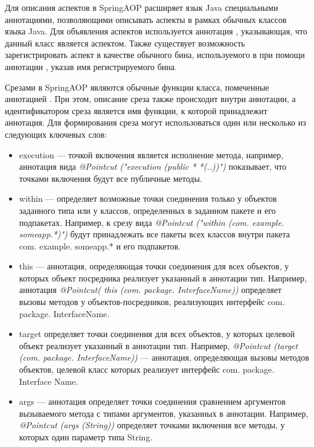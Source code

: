 Для описания аспектов в SpringAOP расширяет язык Java специальными аннотациями,
позволяющими описывать аспекты в рамках обычных классов языка Java.
Для объявления аспектов используется аннотация , указывающая,
что данный класс является аспектом.
Также существует возможность зарегистрировать аспект в качестве обычного бина,
используемого в  при помощи аннотации
, указав имя регистрируемого бина.

Срезами в SpringAOP являются обычные функции класса, помеченные аннотацией
.
При этом, описание среза также происходит внутри аннотации, а идентификатором
среза является имя функции, к которой принадлежит аннотация.
Для формирования среза могут использоваться один или несколько из следующих 
ключевых слов:
  \begin{itemize}
    \item execution --- точкой включения является исполнение метода, 
      например, аннотация вида \textit{@Pointcut ("execution (public * 
      *(..))")} показывает, что точками включения будут все публичные методы.
    \item within --- определяет возможные точки соединения только у объектов 
      заданного типа или у классов, определенных в заданном пакете и его 
      подпакетах.
      Например, к срезу вида \textit{@Pointcut ("within (com. example.
      someapp.*)")} будут принадлежать все пакеты всех классов внутри пакета
      com. example. someapp.* и его подпакетов.
    \item this --- аннотация, определяющая точки соединения для всех объектов,
      у которых объект посредника реализует указанный в аннотации тип.
      Например, аннотация \textit{@Pointcut( this (com. package.
      InterfaceName))} определяет вызовы методов у объектов-посредников,
      реализующих интерфейс com. package. InterfaceName.
    \item target определяет точки соединения для всех объектов, у которых 
      целевой объект реализует указанный в аннотации тип.
      Например, \textit{@Pointcut (target (com. package. InterfaceName))} ---
      аннотация, определяющая вызовы методов объектов, целевой класс которых
      реализует интерфейс com. package. Interface Name.
    \item args --- аннотация определяет точки соединения сравнением аргументов
      вызываемого метода с типами аргументов, указанных в аннотации.
      Например, \textit{@Pointcut (args (String))} определяет точками включения
      все методы, у которых один параметр типа String.
  \end{itemize}
  
